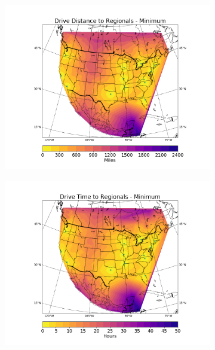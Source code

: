 \documentclass[11pt,twocolumn]{article}
\begin{document}
\begin{figure}
\begin{subfigure}{.5\textwidth}
  \includegraphics[height=.3\textheight]{../figs/Figure_3}
\end{subfigure}%
\begin{subfigure}{.5\textwidth}
  \includegraphics[height=.3\textheight]{../figs/Figure_4}
\end{subfigure}%
\newline
\begin{subfigure}{.5\textwidth}

\end{subfigure}
\end{figure}
\end{document}
